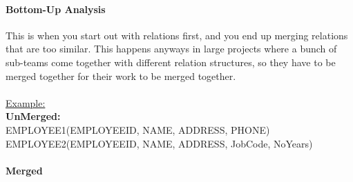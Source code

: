 \documentclass[12pt]{article}
\begin{document}
\paragraph{Bottom-Up Analysis} This is when you start out with relations first, and you end up merging relations that are too similar. This happens anyways in large projects where a bunch of sub-teams come together with different relation structures, so they have to be merged together for their work to be merged together.\\
\\
\underline{Example:}\\
\textbf{UnMerged:}\\
EMPLOYEE1(EMPLOYEEID, NAME, ADDRESS, PHONE)\\
EMPLOYEE2(EMPLOYEEID, NAME, ADDRESS, JobCode, NoYears)\\
\\
\textbf{Merged}
\end{document}
